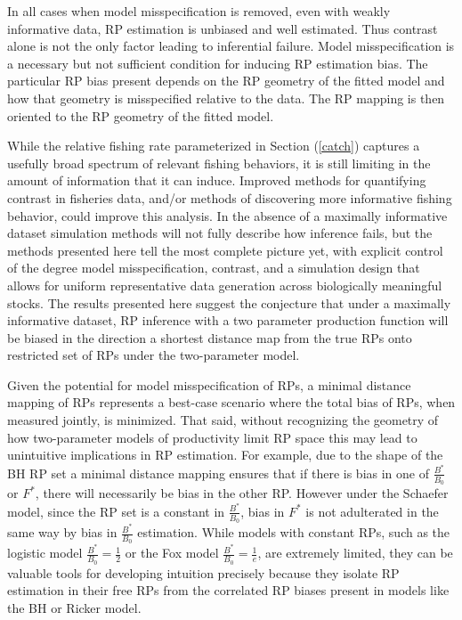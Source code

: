 {%
In all cases when model misspecification is removed, even with weakly informative
data, RP estimation is unbiased and well estimated. Thus contrast alone is
not the only factor leading to inferential failure. Model misspecification is a
necessary but not sufficient condition for inducing RP estimation bias. The
particular RP bias present depends on the RP geometry of the fitted model and
how that geometry is misspecified relative to the data. The RP mapping is then oriented
to the RP geometry of the fitted model.

%
While the relative fishing rate parameterized in Section (\ref{catch}) captures a usefully
broad spectrum of relevant fishing behaviors, it is still limiting in the amount of information
that it can induce. Improved methods for quantifying contrast in fisheries data, and/or methods of
discovering more informative fishing behavior, could improve this analysis. In the absence of a %
maximally informative dataset simulation methods will not fully describe how
inference fails, but the methods presented here tell the most complete picture
yet, with explicit control of the degree model misspecification, contrast, and
a simulation design that allows for uniform representative data generation
across biologically meaningful stocks. The results presented here suggest the
conjecture that under a maximally informative dataset, RP inference with a two
parameter production function will be biased in the direction a shortest distance
map from the true RPs onto restricted set of RPs under the two-parameter model.

%
Given the potential for model misspecification of RPs, a minimal distance
mapping of RPs represents a best-case scenario where the total bias of RPs,
when measured jointly, is minimized. That said, without recognizing the
geometry of how two-parameter models of productivity limit RP space this may
lead to unintuitive implications in RP estimation. For example, due to the
shape of the BH RP set a minimal distance mapping ensures that if there is
bias in one of $\frac{B^*}{B_0}$ or $F^*$, there will necessarily be
bias in the other RP. However under the Schaefer model, since the RP set is a
constant in $\frac{B^*}{B_0}$, bias in $F^*$ is not adulterated in the
same way by bias in $\frac{B^*}{B_0}$ estimation. While models with
constant RPs, such as the logistic model $\frac{B^*}{B_0}=\frac{1}{2}$ or
the Fox model $\frac{B^*}{B_0}=\frac{1}{e}$, are extremely limited, they
can be valuable tools for developing intuition precisely because they isolate
RP estimation in their free RPs from the correlated RP biases present in
models like the BH or Ricker model.

}
